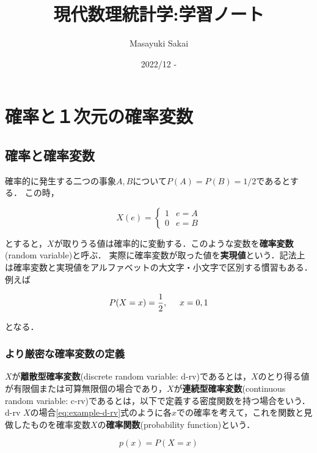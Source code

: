 \documentclass[12pt,a4j,draft]{jarticle}
\title{\center 現代数理統計学:学習ノート }
\author{Masayuki Sakai}
\date{2022/12 - }
\numberwithin{equation}{section}
\theoremstyle{break}
\begin{document}
\maketitle

\tableofcontents
%
\newpage
%
\section{確率と１次元の確率変数}
\subsection{確率と確率変数}

確率的に発生する二つの事象$A,B$について$P(A) = P(B) = 1/2$であるとする．
この時，

\begin{equation}
    X(e) = \begin{cases} 1 & e=A \\ 0 & e=B \end{cases}    
\end{equation}


とすると，$X$が取りうる値は確率的に変動する．このような変数を\textbf{確率変数}(random variable)と呼ぶ．
実際に確率変数が取った値を\textbf{実現値}という．記法上は確率変数と実現値をアルファベットの大文字・小文字で区別する慣習もある．
例えば

\begin{equation}
P(X=x) = {1 \over 2}, \hspace{5mm} x=0,1
\label{eq:example-d-rv}
\end{equation}

となる．

\subsubsection{より厳密な確率変数の定義}

$X$が\textbf{離散型確率変数}(discrete random variable: d-rv)であるとは，$X$のとり得る値が有限個または可算無限個の場合であり，$X$が\textbf{連続型確率変数}(continuous random variable: c-rv)であるとは，以下で定義する密度関数を持つ場合をいう．
\\
d-rv $X$の場合\eqref{eq:example-d-rv}式のように各$x$での確率を考えて，これを関数と見做したものを確率変数$X$の\textbf{確率関数}(probability function)という．

\begin{equation}
    p(x) = P(X=x)
\end{equation}
\end{document}

